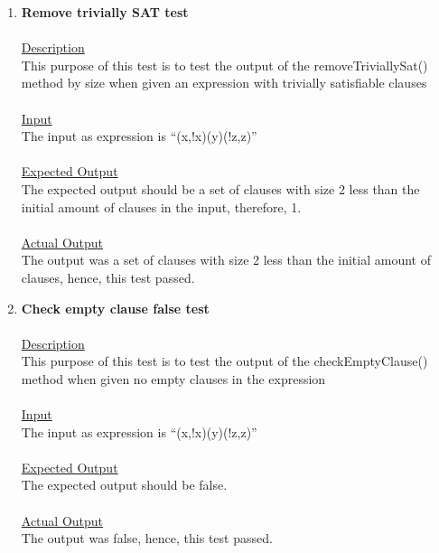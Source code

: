 \documentclass{article}
\newcommand{\quotes}[1]{``#1''}
\begin{document}
\begin{enumerate}
		\item \textbf{Remove trivially SAT test}\\\\
		\underline{Description}\\
		\indent This purpose of this test is to test the output of the removeTriviallySat() method by size when given an expression with trivially satisfiable clauses\\\\
		\underline{Input}\\
		\indent The input as expression is \quotes{(x,!x)(y)(!z,z)}\\	\\
		\underline{Expected Output}\\
		\indent The expected output should be a set of clauses with size 2 less than the initial amount of clauses in the input, therefore, 1.\\\\
		\underline{Actual Output}\\
		\indent The output was a set of clauses with size 2 less than the initial amount of clauses, hence, this test passed.\\
		
		\item \textbf{Check empty clause false test}\\\\
		\underline{Description}\\
		\indent This purpose of this test is to test the output of the checkEmptyClause() method when given no empty clauses in the expression\\\\
		\underline{Input}\\
		\indent The input as expression is \quotes{(x,!x)(y)(!z,z)}\\	\\
		\underline{Expected Output}\\
		\indent The expected output should be false.\\\\
		\underline{Actual Output}\\
		\indent The output was false, hence, this test passed.\\
		

\end{enumerate}
\end{document}
